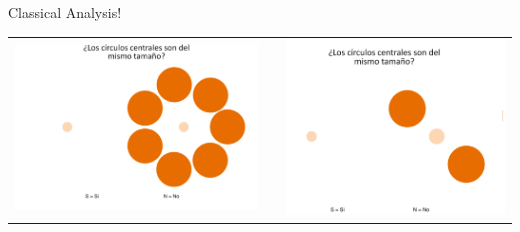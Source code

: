 \documentclass[final]{beamer}
\newlength{\twocolwid}
\begin{document}
\begin{frame}[t]
\begin{columns}[t]
\begin{column}{\twocolwid}
\begin{columns}[t,totalwidth=\twocolwid]
\begin{column}{\twocolwid}
\begin{alertblock}{Classical Analysis!}


\begin{center}
\begin{tabular}{ccc}
\includegraphics[width=0.55\linewidth]{Figures/MainTask.png} & \hfill & \includegraphics[width=0.5\linewidth]{Figures/MainTask2.png}
\end{tabular}
\end{center}



\end{alertblock}



\end{column}
\end{columns}
\end{column}
\end{columns}
\end{frame}
\end{document}
